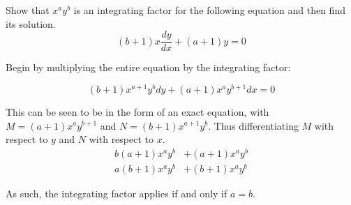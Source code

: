 Show that $x^ay^b$ is an integrating factor for the following equation and then find its solution.
\begin{equation*}
	(b+1)x\frac{dy}{dx}+(a+1)y=0
\end{equation*}

Begin by multiplying the entire equation by the integrating factor:

\begin{equation*}
	(b+1)x^{a+1}y^bdy+(a+1)x^ay^{b+1}dx=0
\end{equation*}

This can be seen to be in the form of an exact equation, with $M=(a+1)x^ay^{b+1}$ and $N=(b+1)x^{a+1}y^b$. Thus differentiating $M$ with respect to $y$ and $N$ with respect to $x$.
\begin{align*} 
b(a+1)x^ay^b &+(a+1)x^ay^b \\ 
a(b+1)x^ay^b &+(b+1)x^ay^b 
\end{align*}

As such, the integrating factor applies if and only if $a=b$. 

